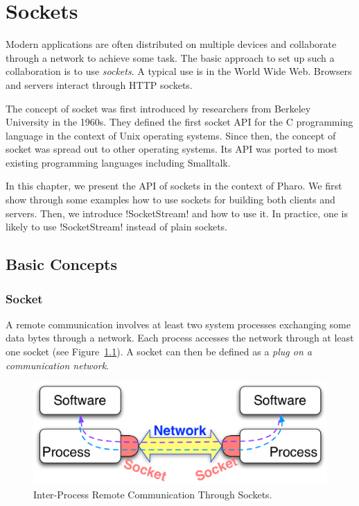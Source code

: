 \documentclass[a4paper,10pt,twoside]{book}
\begin{document}
	\sloppy
\fi
\newcommand{\nouryComment}[1]{}


\chapter{Sockets}\label{cha:sockets}
\chapterauthor{\authornoury{}}

Modern applications are often distributed on multiple devices and collaborate through a network to achieve some task.
The basic approach to set up such a collaboration is to use \textit{sockets}.
A typical use is in the World Wide Web. Browsers and servers interact through HTTP sockets.

The concept of socket was first introduced by researchers from Berkeley University in the 1960s. They defined the first socket API for the C programming language in the context of Unix operating systems. Since then, the concept of socket was spread out to other operating systems. 
Its API was ported to most existing programming languages including Smalltalk.

In this chapter, we present the API of sockets in the context of Pharo.
We first show through some examples how to use sockets for building both clients and servers.
Then, we introduce \ct!SocketStream! and how to use it.
In practice, one is likely to use \ct!SocketStream! instead of plain sockets.

\section{Basic Concepts}
\subsection{Socket}
A remote communication involves at least two system processes exchanging some data bytes through a network. Each process accesses the network through at least one socket (see Figure~\ref{fig:socketConcept}).
A socket can then be defined as a \textit{plug on a communication network}.

\begin{figure}[ht]\centering
	\includegraphics[width=.75\linewidth]{socketConcept}
	\caption{Inter-Process Remote Communication Through Sockets.}
	\label{fig:socketConcept}
\end{figure}
\end{document}
